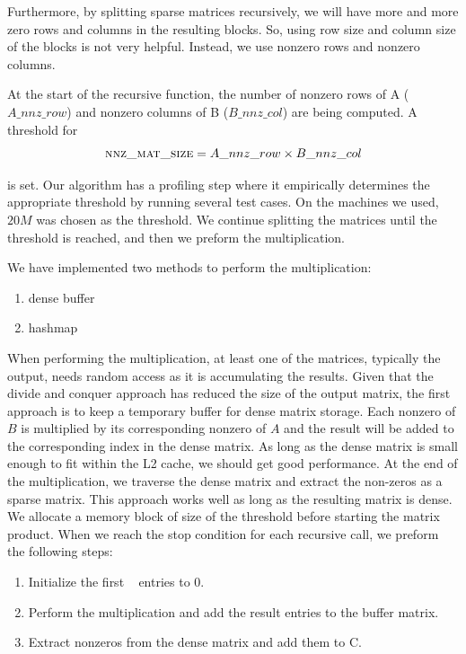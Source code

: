 Furthermore, by splitting sparse matrices recursively, we will have more and more zero rows and columns in the resulting blocks. So, using row size and column size of the blocks is not very helpful. Instead, we use nonzero rows and nonzero columns.

At the start of the recursive function, the number of nonzero rows of A ($A\_nnz\_row$) and nonzero columns of B ($B\_nnz\_col$) are being computed. A threshold for 
\begin{equation}
    \textsc{nnz\_mat\_size} = A\_nnz\_row \times B\_nnz\_col
\end{equation}

is set. Our algorithm has a profiling step where it empirically determines the appropriate threshold by running several test cases. On the machines we used,  $20M$ was chosen as the threshold. We continue splitting the matrices until the threshold is reached, and then we preform the multiplication.


We have implemented two methods to perform the multiplication: 
\begin{enumerate}
    \item dense buffer
    \item hashmap
\end{enumerate}

When performing the multiplication, at least one of the matrices, typically the output, needs random access as it is accumulating the results. Given that the divide and conquer approach has reduced the size of the output matrix, the first approach is to keep a temporary buffer for dense matrix storage. Each nonzero of $B$ is multiplied by its corresponding nonzero of $A$ and the result will be added to the corresponding index in the dense matrix. As long as the dense matrix is small enough to fit within the L2 cache, we should get good performance. At the end of the multiplication, we traverse the dense matrix and extract the non-zeros as a sparse matrix. This approach works well as long as the resulting matrix is dense. We allocate a memory block of size of the threshold before starting the matrix product. When we reach the stop condition for each recursive call, we preform the following steps:
\begin{enumerate}
    \item Initialize the first \nnzsz~ entries to 0.
    \item Perform the multiplication and add the result entries to the buffer matrix.
    \item Extract nonzeros from the dense matrix and add them to C.
\end{enumerate}


